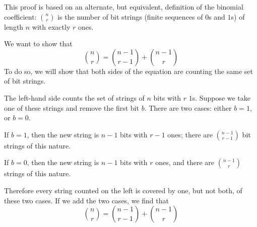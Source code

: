 \documentclass[12pt]{article}
\begin{document}
This proof is based on an alternate, but equivalent, definition of the binomial coefficient: $\binom{n}{r}$ is the number of bit strings (finite sequences of $0$s and $1$s) of length $n$ with exactly $r$ ones.

We want to show that
$$\binom{n}{r} = \binom{n-1}{r-1} + \binom{n-1}{r}$$
To do so, we will show that both sides of the equation are counting the same set of bit strings.

The left-hand side counts the set of strings of $n$ bits with $r$ $1$s.  Suppose we take one of these strings and remove the first bit $b$.  There are two cases: either $b = 1$, or $b = 0$.

If $b = 1$, then the new string is $n-1$ bits with $r-1$ ones; there are $\binom{n-1}{r-1}$ bit strings of this nature.

If $b = 0$, then the new string is $n-1$ bits with $r$ ones, and there are $\binom{n-1}{r}$ strings of this nature.

Therefore every string counted on the left is covered by one, but not both, of these two cases.  If we add the two cases, we find that
$$\binom{n}{r} = \binom{n-1}{r-1} + \binom{n-1}{r}$$
\end{document}
